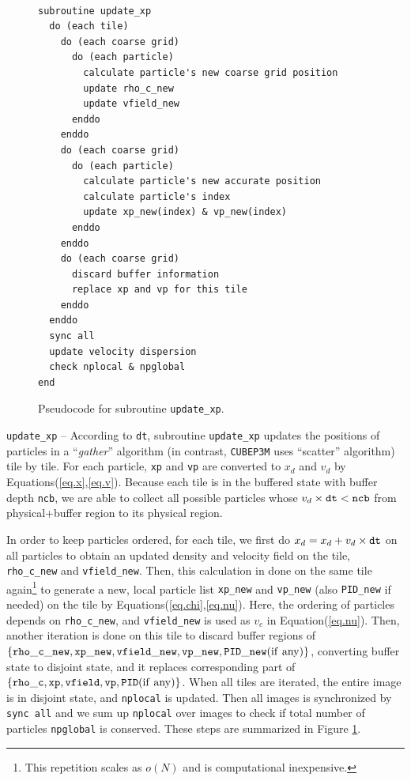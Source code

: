 \documentclass[10pt,twocolumn,preprint]{emulateapj}
\begin{document}
\begin{figure}[]
\begin{verbatim}

subroutine update_xp
  do (each tile)
    do (each coarse grid)
      do (each particle)
        calculate particle's new coarse grid position
        update rho_c_new
        update vfield_new
      enddo
    enddo
    do (each coarse grid)
      do (each particle)
        calculate particle's new accurate position
        calculate particle's index
        update xp_new(index) & vp_new(index)
      enddo
    enddo
    do (each coarse grid)
      discard buffer information
      replace xp and vp for this tile
    enddo
  enddo
  sync all
  update velocity dispersion
  check nplocal & npglobal
end
\end{verbatim}
\caption{Pseudocode for subroutine {\tt update\_xp}.}
\label{fig.update_xp}
\end{figure}

{\tt update\_xp} --
According to {\tt dt}, subroutine {\tt update\_xp} updates the positions of particles in a ``{\it gather}'' algorithm (in contrast, {\tt CUBEP3M} uses ``scatter'' algorithm) tile by tile. For each particle, {\tt xp} and {\tt vp} are converted to $x_d$ and $v_d$ by Equations(\ref{eq.x},\ref{eq.v}). Because each tile is in the buffered state with buffer depth {\tt ncb}, we are able to collect all possible particles whose $v_d\times{\tt dt}<{\tt ncb}$ from physical+buffer region to its physical region.

In order to keep particles ordered, for each tile, we first do $x_d=x_d+v_d\times{\tt dt}$ on all particles to obtain an updated density and velocity field on the tile, {\tt rho\_c\_new} and {\tt vfield\_new}. Then, this calculation in done on the same tile again\footnote{This repetition scales as $o(N)$ and is computational inexpensive.} to generate a new, local particle list {\tt xp\_new} and {\tt vp\_new} (also {\tt PID\_new} if needed) on the tile by Equations(\ref{eq.chi},\ref{eq.nu}). Here, the ordering of particles depends on {\tt rho\_c\_new}, and {\tt vfield\_new} is used as $v_c$ in Equation(\ref{eq.nu}). Then, another iteration is done on this tile to discard buffer regions of $\{{\tt rho\_c\_new},{\tt xp\_new},{\tt vfield\_new},{\tt vp\_new},{\tt PID\_new}({\rm if\ any})\}$, converting buffer state to disjoint state, and it replaces corresponding part of $\{{\tt rho\_c},{\tt xp},{\tt vfield},{\tt vp},{\tt PID}({\rm if\ any})\}$. When all tiles are iterated, the entire image is in disjoint state, and {\tt nplocal} is updated. Then all images is synchronized by {\tt sync all} and we sum up {\tt nplocal} over images to check if total number of particles {\tt npglobal} is conserved. These steps are summarized in Figure \ref{fig.update_xp}.
\end{document}
